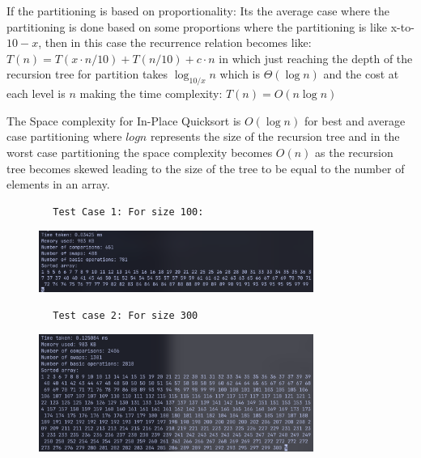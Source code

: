 \documentclass{article}
\begin{document}
\begin{enumerate}
\begin{enumerate}[label*=\arabic*.]
        If the partitioning is based on proportionality: Its the average case where the partitioning is done based on some proportions where the partitioning is like x-to-\(10-x\), then in this case the recurrence relation becomes like: \( T(n) = T(x \cdot n/10) + T(n/10) + c \cdot n \) in which just reaching the depth of the recursion tree for partition takes \( \log_{10/x} n \) which is \( \Theta(\log n) \) and the cost at each level is \( n \) making the time complexity: \( T(n) = O(n \log n) \)

        The Space complexity for In-Place Quicksort is \( O(\log n) \) for best and average case partitioning where \( logn \) represents the size of the recursion tree and in the worst case partitioning the space complexity becomes \( O (n) \) as the recursion tree becomes skewed leading to the size of the tree to be equal to the number of elements in an array. 

        \begin{verbatim}
        Test Case 1: For size 100:
        \end{verbatim}

        \begin{figure}[h]
            \centering
            \includegraphics[width=0.8\textwidth]{./quicksort-tc-1.png}
            \label{fig:image1}
        \end{figure}

        \begin{verbatim}
        Test case 2: For size 300
        \end{verbatim}

        \begin{figure}[h]
            \centering
            \includegraphics[width=0.8\textwidth]{./quicksort-tc-2.png}
            \label{fig:image2}
        \end{figure}


\end{enumerate}
\end{enumerate}
\end{document}
